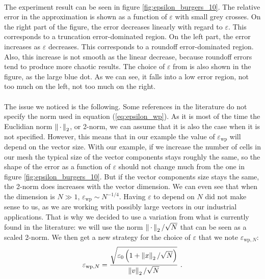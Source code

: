       \paragraph{}
      The experiment result can be seen in figure \ref{fig:epsilon_burgers_10}.
      The relative error in the approximation is shown as a function of $\varepsilon$ with small grey crosses.
      On the right part of the figure, the error decreases linearly with regard to $\varepsilon$.
      This corresponds to a truncation error-dominated region.
      On the left part, the error increases as $\varepsilon$ decreases.
      This corresponds to a roundoff error-dominated region.
      Also, this increase is not smooth as the linear decrease, because roundoff errors tend to produce more chaotic results.
      The choice of $\varepsilon$ from \cite{PerniceWalker1998} is also shown in the figure, as the large blue dot.
      As we can see, it falls into a low error region, not too much on the left, not too much on the right.

      \paragraph{}
      The issue we noticed is the following.
      Some references in the literature do not specify the norm used in equation (\ref{eq:epsilon_wp}).
      As it is most of the time the Euclidian norm $\norm[2]{\,\cdot\,}$, or 2-norm, we can assume that it is also the case when it is not specified.
      However, this means that in our example the value of $\varepsilon_\textrm{wp}$ will depend on the vector size.
      With our example, if we increase the number of cells in our mesh the typical size of the vector components stays roughly the same, so the shape of the error as a function of $\varepsilon$ should not change much from the one in figure \ref{fig:epsilon_burgers_10}.
      But if the vector components size stays the same, the 2-norm does increases with the vector dimension.
      We can even see that when the dimension is $N \gg 1$, $\varepsilon_\textrm{wp} \sim N^{-1/4}$.
      Having $\varepsilon$ to depend on $N$ did not make sense to us, as we are working with possibly large vectors in our industrial applications.
      That is why we decided to use a variation from what is currently found in the literature: we will use the norm $\norm[2]{\,\cdot\,} / \sqrt{N}$ that can be seen as a scaled 2-norm.
      We then get a new strategy for the choice of $\varepsilon$ that we note $\varepsilon_{\textrm{wp}, N}$:
      \begin{equation}
        \varepsilon_{\textrm{wp}, N} = \frac{\sqrt{\varepsilon_0 \left(1 + \norm[2]{x} / \sqrt{N}\right) }}{\norm[2]{v} / \sqrt{N}} \ .
      \end{equation}

